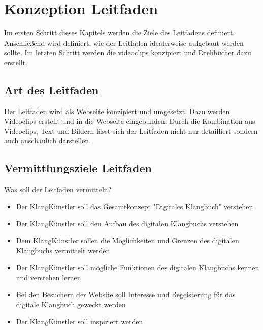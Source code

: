 






\chapter{Konzeption Leitfaden}

Im ersten Schritt dieses Kapitels werden die Ziele des Leitfadens definiert. Anschließend wird definiert, wie der Leitfaden idealerweise aufgebaut werden sollte. Im letzten Schritt werden die \gls{videoclip}s konzipiert und Drehbücher dazu erstellt.




\section{Art des Leitfaden}
Der Leitfaden wird als Webseite konzipiert und umgesetzt. Dazu werden Videoclips erstellt und in die Webseite eingebunden. Durch die Kombination aus Videoclips, Text und Bildern lässt sich der Leitfaden nicht nur detailliert sondern auch anschaulich darstellen. 



\section{Vermittlungsziele Leitfaden}
Was soll der Leitfaden vermitteln?

\begin{itemize}
\item Der KlangKünstler soll das Gesamtkonzept "Digitales Klangbuch" verstehen
\item Der KlangKünstler soll den Aufbau des digitalen Klangbuchs verstehen
\item Dem KlangKünstler sollen die Möglichkeiten und Grenzen des digitalen Klangbuchs vermittelt werden
\item Der KlangKünstler soll mögliche Funktionen des digitalen Klangbuchs kennen und verstehen lernen
\item Bei den Besuchern der Website soll Interesse und Begeisterung für das digitale Klangbuch geweckt werden
\item Der KlangKünstler soll inspiriert werden
\end{itemize}


